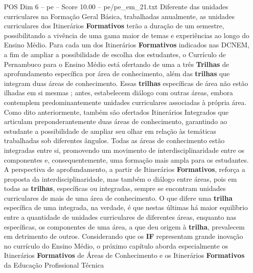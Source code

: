 \begin{textsample}{POS Dim 6 – pe – Score 10.00 – pe/pe\_em\_21.txt}
Diferente das unidades curriculares na Formação Geral Básica, trabalhadas anualmente, as unidades curriculares dos Itinerários \textbf{Formativos} terão a duração de um semestre, possibilitando a vivência de uma gama maior de temas e experiências ao longo do Ensino Médio.
Para cada um dos Itinerários \textbf{Formativos} indicados nas DCNEM, a fim de ampliar a possibilidade de escolha dos estudantes, o Currículo de Pernambuco para o Ensino Médio está ofertando de uma a três \textbf{Trilhas} de aprofundamento específica por área de conhecimento, além das \textbf{trilhas} que integram duas áreas de conhecimento.
Essas \textbf{trilhas} específicas de área não estão ilhadas em si mesmas ; antes, estabelecem diálogo com outras áreas, embora contemplem predominantemente unidades curriculares associadas à própria área.
Como dito anteriormente, também são ofertados Itinerários Integrados que articulam preponderantemente duas áreas de conhecimento, garantindo ao estudante a possibilidade de ampliar seu olhar em relação às temáticas trabalhadas sob diferentes ângulos.
Todas as áreas de conhecimento estão integradas entre si, promovendo um movimento de interdisciplinaridade entre os componentes e, consequentemente, uma formação mais ampla para os estudantes.
A perspectiva de aprofundamento, a partir de Itinerários \textbf{Formativos}, reforça a proposta da interdisciplinaridade, mas também o diálogo entre áreas, pois em todas as \textbf{trilhas}, específicas ou integradas, sempre se encontram unidades curriculares de mais de uma área de conhecimento.
O que difere uma \textbf{trilha} específica de uma integrada, na verdade, é que nestas últimas há maior equilíbrio entre a quantidade de unidades curriculares de diferentes áreas, enquanto nas específicas, os componentes de uma área, a que deu origem à \textbf{trilha}, prevalecem em detrimento de outros.
Considerando que os \textbf{IF} representam grande inovação no currículo do Ensino Médio, o próximo capítulo aborda especialmente os Itinerários \textbf{Formativos} de Áreas de Conhecimento e os Itinerários \textbf{Formativos} da Educação Profissional Técnica

\end{textsample}

